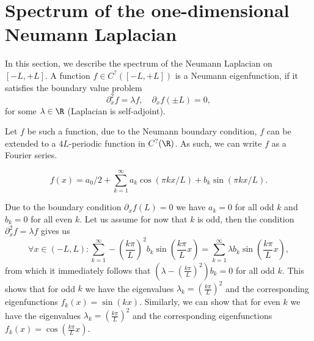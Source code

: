 \section{Spectrum of the one-dimensional Neumann Laplacian}

In this section, we describe the spectrum of the Neumann Laplacian on $[-L, +L]$. A function $f \in C^?([-L, +L])$ is a Neumann eigenfunction, if it satisfies the boundary value problem
\[
  \partial_x^2 f = \lambda f, \quad \partial_x f(\pm L) = 0,
\]
for some $\lambda \in \R$ (Laplacian is self-adjoint).

Let $f$ be such a function, due to the Neumann boundary condition, $f$ can be extended to a \( 4L \)-periodic function in \( C^?(\R) \). As such, we can write $f$ as a Fourier series.

\[
  f(x) = a_0/2 + \sum_{k=1}^\infty a_k \cos(\pi k x / L) + b_k \sin(\pi k x / L).
\]

Due to the boundary condition $\partial_x f(L) = 0$ we have $a_k = 0$ for all odd $k$ and $b_k = 0$ for all even $k$. Let us assume for now that $k$ is odd, then the condition \( \partial_x^2 f = \lambda f \) gives us
\[
  \forall x \in (-L, L) : \sum_{k=1}^\infty - (\frac{k\pi}{L})^2 b_k \sin(\frac{k\pi}{L} x) =  \sum_{k=1}^\infty \lambda b_k \sin(\frac{k\pi}{L} x),
\]
from which it immediately follows that $(\lambda - (\frac{k\pi}{L})^2)b_k = 0$ for all odd $k$. This shows that for odd $k$ we have the eigenvalues $\lambda_k = (\frac{k\pi}{L})^2$ and the corresponding eigenfunctions $f_k (x) = \sin(k x)$. Similarly, we can show that for even $k$ we have the eigenvalues $\lambda_k = (\frac{k\pi}{L})^2$ and the corresponding eigenfunctions \( f_k (x) = \cos(\frac{k\pi}{L} x) \).